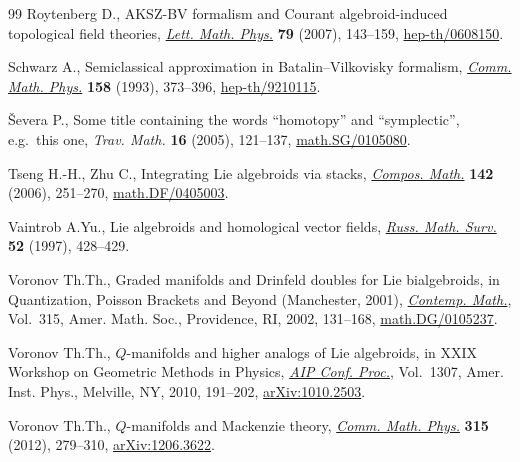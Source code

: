 \documentclass[10pt,a4paper]{amsart}
\numberwithin{equation}{section}
\begin{document}
\begin{thebibliography}{99}
Roytenberg D., A{KSZ}-{BV} formalism and {C}ourant algebroid-induced
  topological f\/ield theories, \href{http://dx.doi.org/10.1007/s11005-006-0134-y}{\textit{Lett. Math. Phys.}} \textbf{79} (2007),
  143--159, \href{http://arxiv.org/abs/hep-th/0608150}{hep-th/0608150}.

Schwarz A., Semiclassical approximation in {B}atalin--{V}ilkovisky formalism,
  \href{http://dx.doi.org/10.1007/BF02108080}{\textit{Comm. Math. Phys.}} \textbf{158} (1993), 373--396,
  \href{http://arxiv.org/abs/hep-th/9210115}{hep-th/9210115}.

{\v{S}}evera P., Some title containing the words ``homotopy'' and
  ``symplectic'', e.g.~this one, \textit{Trav. Math.} \textbf{16} (2005),
  121--137, \href{http://arxiv.org/abs/math.SG/0105080}{math.SG/0105080}.

Tseng H.-H., Zhu C., Integrating {L}ie algebroids via stacks, \href{http://dx.doi.org/10.1112/S0010437X05001752}{\textit{Compos.
  Math.}} \textbf{142} (2006), 251--270, \href{http://arxiv.org/abs/math.DF/0405003}{math.DF/0405003}.

Vaintrob A.Yu., Lie algebroids and homological vector f\/ields, \href{http://dx.doi.org/10.1070/RM1997v052n02ABEH001802}{\textit{Russ.
  Math. Surv.}} \textbf{52} (1997), 428--429.

Voronov Th.Th., Graded manifolds and {D}rinfeld doubles for {L}ie bialgebroids,
  in Quantization, {P}oisson Brackets and Beyond ({M}anchester, 2001),
  \href{http://dx.doi.org/10.1090/conm/315/05478}{\textit{Contemp. Math.}}, Vol.~315, Amer. Math. Soc., Providence, RI, 2002,
  131--168, \href{http://arxiv.org/abs/math.DG/0105237}{math.DG/0105237}.

Voronov Th.Th., {$Q$}-manifolds and higher analogs of {L}ie algebroids, in X{XIX}
  {W}orkshop on {G}eometric {M}ethods in {P}hysics, \href{http://dx.doi.org/10.1063/1.3527417}{\textit{AIP Conf. Proc.}},
  Vol.~1307, Amer. Inst. Phys., Melville, NY, 2010, 191--202,
  \href{http://arxiv.org/abs/1010.2503}{arXiv:1010.2503}.

Voronov Th.Th., {$Q$}-manifolds and {M}ackenzie theory, \href{http://dx.doi.org/10.1007/s00220-012-1568-y}{\textit{Comm. Math.
  Phys.}} \textbf{315} (2012), 279--310, \href{http://arxiv.org/abs/1206.3622}{arXiv:1206.3622}.

\end{thebibliography}
\end{document}

